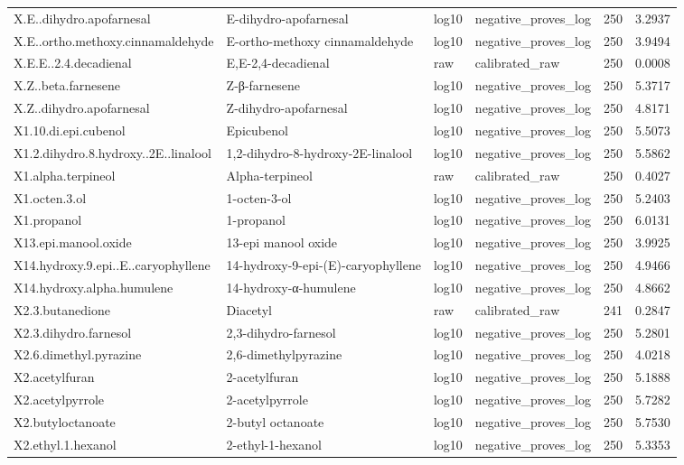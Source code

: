 {\begin{longtable}{llllrr}
X.E..dihydro.apofarnesal & E-dihydro-apofarnesal & log10 & negative\_proves\_log & 250 & 3.2937 \\
X.E..ortho.methoxy.cinnamaldehyde & E-ortho-methoxy cinnamaldehyde & log10 & negative\_proves\_log & 250 & 3.9494 \\
X.E.E..2.4.decadienal & E,E-2,4-decadienal & raw & calibrated\_raw & 250 & 0.0008 \\
X.Z..beta.farnesene & Z-β-farnesene & log10 & negative\_proves\_log & 250 & 5.3717 \\
X.Z..dihydro.apofarnesal & Z-dihydro-apofarnesal & log10 & negative\_proves\_log & 250 & 4.8171 \\
X1.10.di.epi.cubenol & Epicubenol & log10 & negative\_proves\_log & 250 & 5.5073 \\
X1.2.dihydro.8.hydroxy..2E..linalool & 1,2-dihydro-8-hydroxy-2E-linalool & log10 & negative\_proves\_log & 250 & 5.5862 \\
X1.alpha.terpineol & Alpha-terpineol & raw & calibrated\_raw & 250 & 0.4027 \\
X1.octen.3.ol & 1-octen-3-ol & log10 & negative\_proves\_log & 250 & 5.2403 \\
X1.propanol & 1-propanol & log10 & negative\_proves\_log & 250 & 6.0131 \\
X13.epi.manool.oxide & 13-epi manool oxide & log10 & negative\_proves\_log & 250 & 3.9925 \\
X14.hydroxy.9.epi..E..caryophyllene & 14-hydroxy-9-epi-(E)-caryophyllene & log10 & negative\_proves\_log & 250 & 4.9466 \\
X14.hydroxy.alpha.humulene & 14-hydroxy-α-humulene & log10 & negative\_proves\_log & 250 & 4.8662 \\
X2.3.butanedione & Diacetyl & raw & calibrated\_raw & 241 & 0.2847 \\
X2.3.dihydro.farnesol & 2,3-dihydro-farnesol & log10 & negative\_proves\_log & 250 & 5.2801 \\
X2.6.dimethyl.pyrazine & 2,6-dimethylpyrazine & log10 & negative\_proves\_log & 250 & 4.0218 \\
X2.acetylfuran & 2-acetylfuran & log10 & negative\_proves\_log & 250 & 5.1888 \\
X2.acetylpyrrole & 2-acetylpyrrole & log10 & negative\_proves\_log & 250 & 5.7282 \\
X2.butyloctanoate & 2-butyl octanoate & log10 & negative\_proves\_log & 250 & 5.7530 \\
X2.ethyl.1.hexanol & 2-ethyl-1-hexanol & log10 & negative\_proves\_log & 250 & 5.3353 \\

\end{longtable}}
